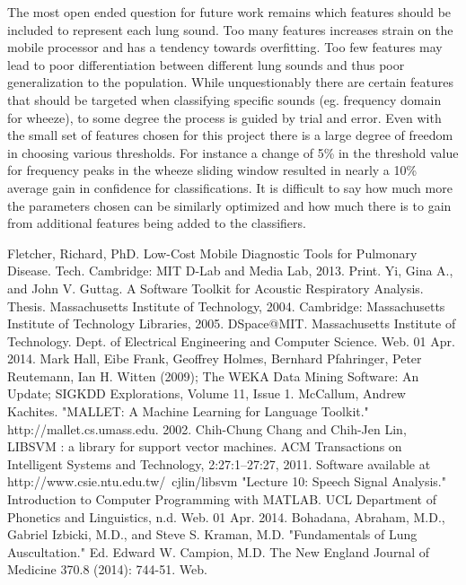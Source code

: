 \documentclass{article}
\begin{document}
The most open ended question for future work remains which features should be included to represent each lung sound. Too many features increases strain on the mobile processor and has a tendency towards overfitting. Too few features may lead to poor differentiation between different lung sounds and thus poor generalization to the population. While unquestionably there are certain features that should be targeted when classifying specific sounds (eg. frequency domain for wheeze), to some degree the process is guided by trial and error. Even with the small set of features chosen for this project there is a large degree of freedom in choosing various thresholds. For instance a change of 5\% in the threshold value for frequency peaks in the wheeze sliding window resulted in nearly a 10\% average gain in confidence for classifications. It is difficult to say how much more the parameters chosen can be similarly optimized and how much there is to gain from additional features being added to the classifiers.\\

\newpage

\begin{thebibliography}{9}
	Fletcher, Richard, PhD. Low-Cost Mobile Diagnostic Tools for Pulmonary Disease. Tech. Cambridge: MIT D-Lab and Media Lab, 2013. Print.
	Yi, Gina A., and John V. Guttag. A Software Toolkit for Acoustic Respiratory Analysis. Thesis. Massachusetts Institute of Technology, 2004. Cambridge: Massachusetts Institute of Technology Libraries, 2005. DSpace@MIT. Massachusetts Institute of Technology. Dept. of Electrical Engineering and Computer Science. Web. 01 Apr. 2014.
	Mark Hall, Eibe Frank, Geoffrey Holmes, Bernhard Pfahringer, Peter Reutemann, Ian H. Witten (2009); The WEKA Data Mining Software: An Update; SIGKDD Explorations, Volume 11, Issue 1.
	McCallum, Andrew Kachites.  "MALLET: A Machine Learning for Language Toolkit."
	http://mallet.cs.umass.edu. 2002.
	Chih-Chung Chang and Chih-Jen Lin, LIBSVM : a library for support vector machines. ACM Transactions on Intelligent Systems and Technology, 2:27:1--27:27, 2011. Software available at http://www.csie.ntu.edu.tw/~cjlin/libsvm
	"Lecture 10: Speech Signal Analysis." Introduction to Computer Programming with MATLAB. UCL Department of Phonetics and Linguistics, n.d. Web. 01 Apr. 2014.
	Bohadana, Abraham, M.D., Gabriel Izbicki, M.D., and Steve S. Kraman, M.D. "Fundamentals of Lung Auscultation." Ed. Edward W. Campion, M.D. The New England Journal of Medicine 370.8 (2014): 744-51. Web.
\end{thebibliography}
\end{document}
